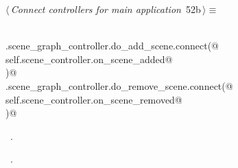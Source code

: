\documentclass[
    a4paper,      %
    10pt,         %
    openright,    %
    notitlepage,  %
    parskip=half, %
]{scrreprt}       %
\theoremstyle{definition}                    %
\begin{document}
\begin{flushleft} \small
\begin{minipage}{\linewidth}\label{scrap77}\raggedright\small
{} $\langle\,${\itshape Connect controllers for main application}\nobreak\ {\footnotesize {52b}}$\,\rangle\equiv$
\vspace{-1exm}
\begin{list}{}{} \item
\mbox{}\lstinline@@\\
\mbox{}\lstinline@self.scene_graph_controller.do_add_scene.connect(@\\
\mbox{}\lstinline@    self.scene_controller.on_scene_added@\\
\mbox{}\lstinline@)@\\
\mbox{}\lstinline@self.scene_graph_controller.do_remove_scene.connect(@\\
\mbox{}\lstinline@    self.scene_controller.on_scene_removed@\\
\mbox{}\lstinline@)@{\NWsep}
\end{list}
\vspace{-1.5ex}
\footnotesize
\begin{list}{}{\setlength{\itemsep}{-\parsep}\setlength{\itemindent}{-\leftmargin}}
\item \NWtxtMacroDefBy\ .
\item \NWtxtMacroRefIn\ .

\item{}
\end{list}
\end{minipage}\vspace{4ex}
\end{flushleft}
\end{document}
